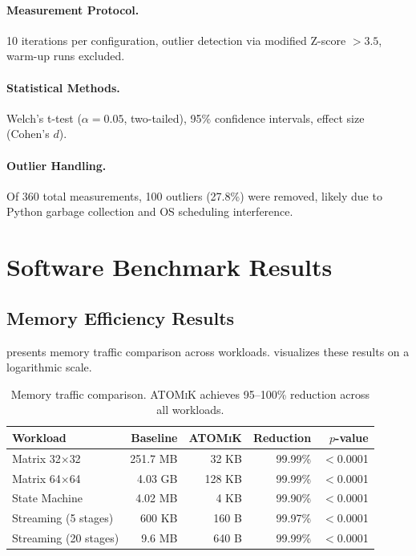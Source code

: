 \documentclass[11pt,letterpaper]{article}
\theoremstyle{plain}
\theoremstyle{definition}
\theoremstyle{remark}
\newcommand{\atomik}{\textsc{ATOMiK}}
\begin{document}
\paragraph{Measurement Protocol.} 10 iterations per configuration, outlier detection via modified Z-score $> 3.5$, warm-up runs excluded.

\paragraph{Statistical Methods.} Welch's t-test ($\alpha = 0.05$, two-tailed), 95\% confidence intervals, effect size (Cohen's $d$).

\paragraph{Outlier Handling.} Of 360 total measurements, 100 outliers (27.8\%) were removed, likely due to Python garbage collection and OS scheduling interference.

\section{Software Benchmark Results}
\label{sec:software}

\subsection{Memory Efficiency Results}

 presents memory traffic comparison across workloads.  visualizes these results on a logarithmic scale.

\begin{table}[!htbp]
\centering
\caption{Memory traffic comparison. \atomik{} achieves 95--100\% reduction across all workloads.}
\label{tab:memory}
\begin{tabular}{@{}lrrrr@{}}
\toprule
\textbf{Workload} & \textbf{Baseline} & \textbf{\atomik{}} & \textbf{Reduction} & \textbf{$p$-value} \\
\midrule
Matrix 32$\times$32 & 251.7 MB & 32 KB & 99.99\% & $<$0.0001 \\
Matrix 64$\times$64 & 4.03 GB & 128 KB & 99.99\% & $<$0.0001 \\
State Machine & 4.02 MB & 4 KB & 99.90\% & $<$0.0001 \\
Streaming (5 stages) & 600 KB & 160 B & 99.97\% & $<$0.0001 \\
Streaming (20 stages) & 9.6 MB & 640 B & 99.99\% & $<$0.0001 \\
\bottomrule
\end{tabular}
\end{table}
\end{document}
